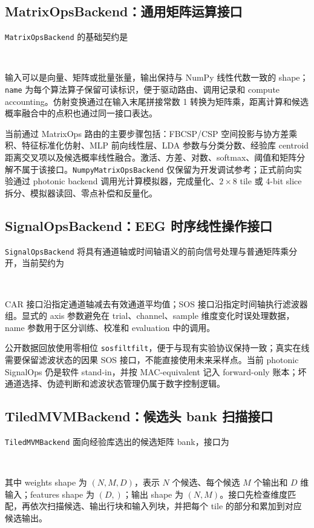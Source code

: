 \documentclass[
    TwoSide=false,
    Degree=graduate,
    GradLevel=master,
    Type=thesis,
    Title={光电混合运动想象脑机接口技术文档}
]{zjuthesis}
\begin{document}
\subsection{MatrixOpsBackend：通用矩阵运算接口}
\texttt{MatrixOps}\allowbreak\texttt{Backend} 的基础契约是
\begin{center}\small
{}\\
\end{center}
输入可以是向量、矩阵或批量张量，输出保持与 NumPy 线性代数一致的 shape；\texttt{name} 为每个算法算子保留可读标识，便于驱动路由、调用记录和 compute accounting。仿射变换通过在输入末尾拼接常数 1 转换为矩阵乘，距离计算和候选概率融合中的点积也通过同一接口表达。

当前通过 MatrixOps 路由的主要步骤包括：FBCSP/CSP 空间投影与协方差乘积、特征标准化仿射、MLP 前向线性层、LDA 参数与分类分数、经验库 centroid 距离交叉项以及候选概率线性融合。激活、方差、对数、softmax、阈值和矩阵分解不属于该接口。\texttt{NumpyMatrixOpsBackend} 仅保留为开发调试参考；正式前向实验通过 photonic backend 调用光计算模拟器，完成量化、$2\times8$ tile 或 4-bit slice 拆分、模拟器读回、零点补偿和反量化。

\subsection{SignalOpsBackend：EEG 时序线性操作接口}
\texttt{SignalOps}\allowbreak\texttt{Backend} 将具有通道轴或时间轴语义的前向信号处理与普通矩阵乘分开，当前契约为
\begin{center}\small
{}\\
\end{center}
CAR 接口沿指定通道轴减去有效通道平均值；SOS 接口沿指定时间轴执行滤波器组。显式的 axis 参数避免在 trial、channel、sample 维度变化时误处理数据，name 参数用于区分训练、校准和 evaluation 中的调用。

公开数据回放使用零相位 \texttt{sosfiltfilt}，便于与现有实验协议保持一致；真实在线需要保留滤波状态的因果 SOS 接口，不能直接使用未来采样点。当前 photonic SignalOps 仍是软件 stand-in，并按 MAC-equivalent 记入 forward-only 账本；坏通道选择、伪迹判断和滤波状态管理仍属于数字控制逻辑。

\subsection{TiledMVMBackend：候选头 bank 扫描接口}
\texttt{TiledMVM}\allowbreak\texttt{Backend} 面向经验库选出的候选矩阵 bank，接口为
\begin{center}\small
{}\\
\end{center}
其中 weights shape 为 $(N,M,D)$，表示 $N$ 个候选、每个候选 $M$ 个输出和 $D$ 维输入；features shape 为 $(D,)$；输出 shape 为 $(N,M)$。接口先检查维度匹配，再依次扫描候选、输出行块和输入列块，并把每个 tile 的部分和累加到对应候选输出。
\end{document}
